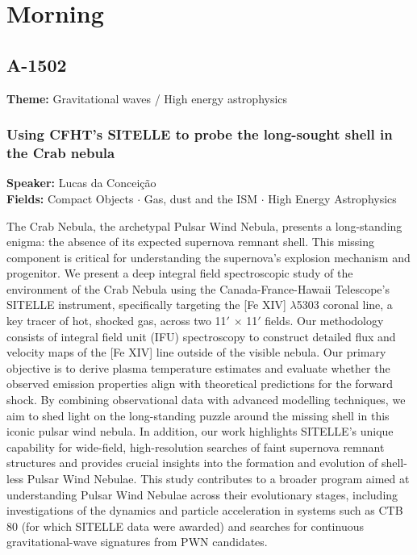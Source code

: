
\section*{Morning}

\subsection*{A-1502}
\textbf{Theme:} Gravitational waves / High energy astrophysics

\hypertarget{abstract-talk-283}{}\label{abstract-page-talk-283}
\subsubsection*{Using CFHT's SITELLE to probe the long-sought shell in the Crab nebula}
\textbf{Speaker:} Lucas da Conceição\\
\textbf{Fields:} Compact Objects $\cdot$ Gas, dust and the ISM $\cdot$ High Energy Astrophysics

The Crab Nebula, the archetypal Pulsar Wind Nebula, presents a long-standing enigma: the absence of its expected supernova remnant shell. This missing component is critical for understanding the supernova's explosion mechanism and progenitor. We present a deep integral field spectroscopic study of the environment of the Crab Nebula using the Canada-France-Hawaii Telescope's SITELLE instrument, specifically targeting the [Fe XIV] $\lambda$5303 coronal line, a key tracer of hot, shocked gas, across two 11$'$ $\times$ 11$'$ fields. Our methodology consists of integral field unit (IFU) spectroscopy to construct detailed flux and velocity maps of the [Fe XIV] line outside of the visible nebula. Our primary objective is to derive plasma temperature estimates and evaluate whether the observed emission properties align with theoretical predictions for the forward shock. By combining observational data with advanced modelling techniques, we aim to shed light on the long-standing puzzle around the missing shell in this iconic pulsar wind nebula. In addition, our work highlights SITELLE's unique capability for wide-field, high-resolution searches of faint supernova remnant structures and provides crucial insights into the formation and evolution of shell-less Pulsar Wind Nebulae. This study contributes to a broader program aimed at understanding Pulsar Wind Nebulae across their evolutionary stages, including investigations of the dynamics and particle acceleration in systems such as CTB 80 (for which SITELLE data were awarded) and searches for continuous gravitational-wave signatures from PWN candidates.

